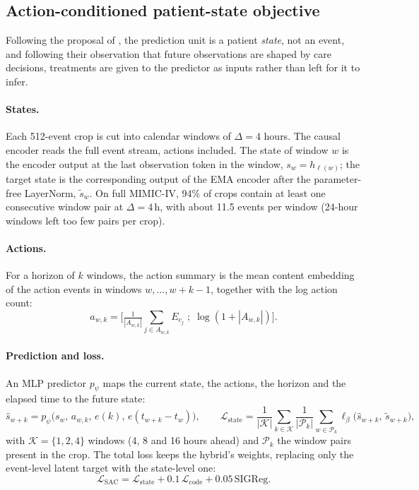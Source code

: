 \documentclass[10pt,letterpaper]{article}
\begin{document}
\subsection{Action-conditioned patient-state objective}
\label{sec:state}

Following the proposal of \citet{imperialjepa}, the prediction unit is a
patient \emph{state}, not an event, and following their observation that future
observations are shaped by care decisions, treatments are given to the
predictor as inputs rather than left for it to infer.

\paragraph{States.}
Each 512-event crop is cut into calendar windows of $\Delta=4$ hours. The causal
encoder reads the full event stream, actions included. The state of window $w$
is the encoder output at the last observation token in the window,
$s_w = h_{\ell(w)}$; the target state is the corresponding output of the EMA
encoder after the parameter-free LayerNorm, $\tilde s_w$. On full MIMIC-IV,
94\% of crops contain at least one consecutive window pair at $\Delta=4$\,h,
with about 11.5 events per window (24-hour windows left too few pairs per crop).

\paragraph{Actions.}
For a horizon of $k$ windows, the action summary is the mean content
embedding of the action events in windows $w,\dots,w+k-1$, together with the
log action count:
\begin{equation}
a_{w,k} = \Big[\tfrac{1}{|A_{w,k}|}\textstyle\sum_{j\in A_{w,k}} E_{c_j}\;;\;\log(1+|A_{w,k}|)\Big].
\end{equation}

\paragraph{Prediction and loss.}
An MLP predictor $p_\psi$ maps the current state, the actions, the horizon and
the elapsed time to the future state:
\begin{equation}
\hat s_{w+k} = p_\psi\big(s_w,\,a_{w,k},\,e(k),\,e(t_{w+k}-t_w)\big),
\qquad
\mathcal{L}_{\mathrm{state}} = \frac{1}{|\mathcal{K}|}\sum_{k\in\mathcal{K}}
\frac{1}{|\mathcal{P}_k|}\sum_{w\in\mathcal{P}_k}\ell_\beta\big(\hat s_{w+k},\,\tilde s_{w+k}\big),
\end{equation}
with $\mathcal{K}=\{1,2,4\}$ windows (4, 8 and 16 hours ahead) and
$\mathcal{P}_k$ the window pairs present in the crop. The total loss keeps the
hybrid's weights, replacing only the event-level latent target with the
state-level one:
\begin{equation}
\mathcal{L}_{\mathrm{SAC}} = \mathcal{L}_{\mathrm{state}} + 0.1\,\mathcal{L}_{\mathrm{code}} + 0.05\,\mathrm{SIGReg}.
\end{equation}
\end{document}
